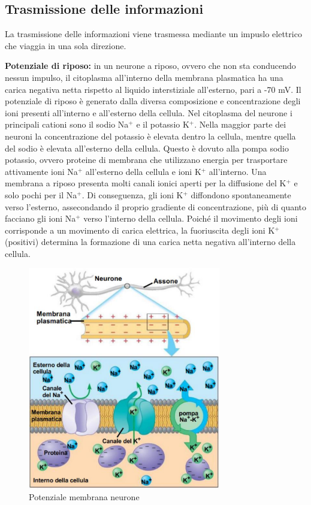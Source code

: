 \documentclass[a4paper]{article}
\begin{document}
\pagebreak

\subsection{Trasmissione delle informazioni}

La trasmissione delle informazioni viene trasmessa mediante un impuslo elettrico
che viaggia in una sola direzione.

\textbf{Potenziale di riposo:} in un neurone a riposo, ovvero che non sta conducendo nessun impulso, il citoplasma
all'interno della membrana plasmatica ha una carica negativa netta rispetto al liquido
interstiziale all'esterno, pari a -70 mV. Il potenziale di riposo è generato dalla diversa
composizione e concentrazione degli ioni presenti all'interno e all'esterno della cellula. Nel
citoplasma del neurone i principali cationi sono il sodio Na\({}^+\) e il potassio K\({}^+\). Nella maggior
parte dei neuroni la concentrazione del potassio è elevata dentro la cellula, mentre quella
del sodio è elevata all'esterno della cellula. Questo è dovuto alla pompa sodio potassio,
ovvero proteine di membrana che utilizzano energia per trasportare attivamente ioni Na\({}^+\)
all'esterno della cellula e ioni K\({}^+\) all'interno. Una membrana a riposo presenta molti canali
ionici aperti per la diffusione del K\({}^+\) e solo pochi per il Na\({}^+\). Di conseguenza, gli ioni K\({}^+\)
diffondono spontaneamente verso l'esterno, assecondando il proprio gradiente di
concentrazione, più di quanto facciano gli ioni Na\({}^+\) verso l'interno della cellula. Poiché il
movimento degli ioni corrisponde a un movimento di carica elettrica, la fuoriuscita degli ioni
K\({}^+\) (positivi) determina la formazione di una carica netta negativa all'interno della cellula.


\begin{center}
\begin{figure}[ht]
    \centering
    \includegraphics[width=0.75\textwidth]{./neurone_membrana.png}
    \caption{Potenziale membrana neurone}
\end{figure}
\end{center}
\end{document}
